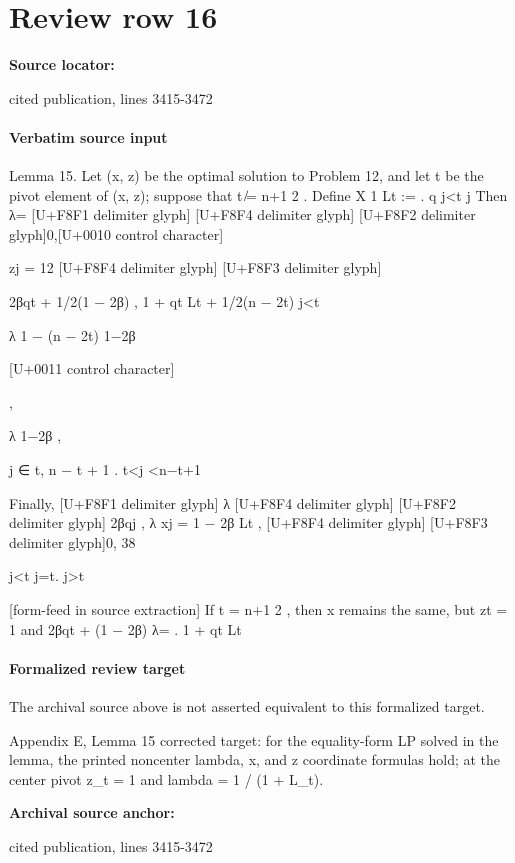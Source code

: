 \documentclass[10pt]{article}
\begin{document}
\section*{Review row 16}
\textbf{Source locator:} {\footnotesize\raggedright cited publication, lines 3415-\allowbreak{}3472\par}
\paragraph{Verbatim source input}
\begin{ReviewVerbatim}
Lemma 15. Let (x, z) be the optimal solution to Problem 12, and let t be the pivot element of (x, z);
suppose that t ̸= n+1
2 . Define
X 1
Lt :=
.
q
j<t j
Then
λ=
[U+F8F1 delimiter glyph]
[U+F8F4 delimiter glyph]
[U+F8F2 delimiter glyph]0,[U+0010 control character]

zj = 12
[U+F8F4 delimiter glyph]
[U+F8F3 delimiter glyph]

2βqt + 1/2(1 − 2β)
,
1 + qt Lt + 1/2(n − 2t)
j<t

λ
1 − (n − 2t) 1−2β

[U+0011 control character]

,

λ
1−2β ,

j ∈ {t, n − t + 1} .
t<j <n−t+1

Finally,
[U+F8F1 delimiter glyph]
λ
[U+F8F4 delimiter glyph]
[U+F8F2 delimiter glyph] 2βqj ,
λ
xj = 1 − 2β
Lt ,
[U+F8F4 delimiter glyph]
[U+F8F3 delimiter glyph]0,
38

j<t
j=t.
j>t


[form-feed in source extraction]
If t = n+1
2 , then x remains the same, but zt = 1 and
2βqt + (1 − 2β)
λ=
.
1 + qt Lt
\end{ReviewVerbatim}


\paragraph{Formalized review target}
The archival source above is not asserted equivalent to this formalized target.
\begin{ReviewVerbatim}
Appendix E, Lemma 15 corrected target: for the equality-form LP solved in the lemma, the printed noncenter lambda, x, and z coordinate formulas hold; at the center pivot z_t = 1 and lambda = 1 / (1 + L_t).
\end{ReviewVerbatim}

\textbf{Archival source anchor:} {\footnotesize\raggedright cited publication, lines 3415-\allowbreak{}3472\par}
\end{document}
